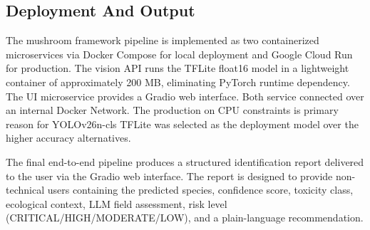 \documentclass[journal,transmag]{IEEEtran}
\begin{document}
\subsection{\textbf{Deployment And Output}}  
The mushroom framework pipeline is implemented as two containerized microservices via Docker Compose for local deployment and Google Cloud Run for production. The vision API runs the TFLite float16 model in a lightweight container of approximately 200 MB, eliminating PyTorch runtime dependency. The UI microservice provides a  Gradio web interface. Both service connected over an internal Docker Network. The production on CPU constraints is primary reason for YOLOv26n-cls TFLite was selected as the deployment model over the higher accuracy alternatives. 

The final end-to-end pipeline produces a structured identification report delivered to the user via the Gradio web interface. The report is designed to provide non-technical users   containing the predicted species, confidence score, toxicity class, ecological context, LLM field assessment, risk level (CRITICAL/HIGH/MODERATE/LOW), and a plain-language recommendation. 
\end{document}
